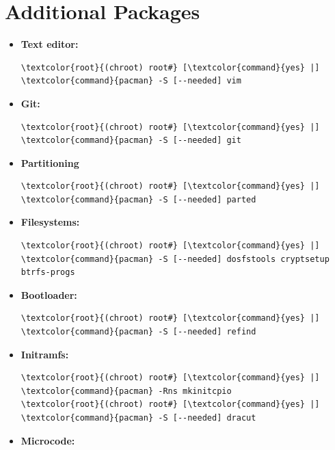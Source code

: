 \documentclass[10pt, a4paper, onecolumn, oneside, titlepage, openany]{book}
\begin{document}
\section{Additional Packages}
\begin{itemize}
    \item \textbf{Text editor:}
\begin{Verbatim}[commandchars=\\\{\}]
\textcolor{root}{(chroot) root#} [\textcolor{command}{yes} |] \textcolor{command}{pacman} -S [--needed] vim
\end{Verbatim}
    \item \textbf{Git:}
\begin{Verbatim}[commandchars=\\\{\}]
\textcolor{root}{(chroot) root#} [\textcolor{command}{yes} |] \textcolor{command}{pacman} -S [--needed] git
\end{Verbatim}
    \item \textbf{Partitioning}
\begin{Verbatim}[commandchars=\\\{\}]
\textcolor{root}{(chroot) root#} [\textcolor{command}{yes} |] \textcolor{command}{pacman} -S [--needed] parted
\end{Verbatim}
    \item \textbf{Filesystems:}
\begin{Verbatim}[commandchars=\\\{\}]
\textcolor{root}{(chroot) root#} [\textcolor{command}{yes} |] \textcolor{command}{pacman} -S [--needed] dosfstools cryptsetup 
btrfs-progs
\end{Verbatim}
    \item \textbf{Bootloader:}
\begin{Verbatim}[commandchars=\\\{\}]
\textcolor{root}{(chroot) root#} [\textcolor{command}{yes} |] \textcolor{command}{pacman} -S [--needed] refind
\end{Verbatim}
     \item \textbf{Initramfs:}
\begin{Verbatim}[commandchars=\\\{\}]
\textcolor{root}{(chroot) root#} [\textcolor{command}{yes} |] \textcolor{command}{pacman} -Rns mkinitcpio
\textcolor{root}{(chroot) root#} [\textcolor{command}{yes} |] \textcolor{command}{pacman} -S [--needed] dracut
\end{Verbatim}
    \item \textbf{Microcode:}
\begin{Verbatim}[commandchars=\\\{\}]

\end{Verbatim}
\end{itemize}
\end{document}
